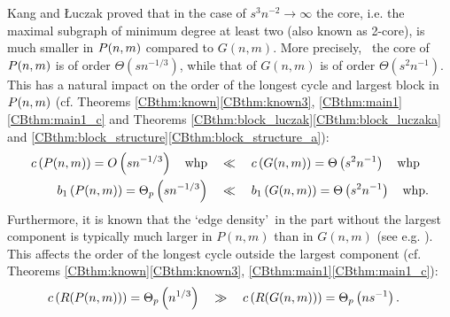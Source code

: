 Kang and {\L}uczak \cite{KangLuczak2012} proved that in the case of $s^3 n^{-2} \to \infty$ the core, i.e. the maximal subgraph of minimum degree at least two (also known as 2-core), is much smaller in $P(n,m)$ compared to $G(n,m)$. More precisely, \whp\ the core of $P(n,m)$ is of order $\Theta\left(sn^{-1/3}\right)$, while that of $G(n,m)$ is of order $\Theta\left(s^2n^{-1}\right)$. This has a natural impact on the order of the longest cycle and largest block in $P(n,m)$ (cf. Theorems \ref{CBthm:known}\ref{CBthm:known3}, \ref{CBthm:main1}\ref{CBthm:main1_c} and Theorems \ref{CBthm:block_luczak}\ref{CBthm:block_luczaka} and \ref{CBthm:block_structure}\ref{CBthm:block_structure_a}):
\begin{align*}
c\left({P(n,m)}\right)=O\left(sn^{-1/3}\right)\quad \text{whp} \quad &\ll \quad c\left({G(n,m)}\right)=\Theta\left(s^2 n^{-1}\right) \quad \text{whp}
\\
b_{1}\left(P(n,m)\right)=\Theta_p\left(sn^{-1/3}\right) \quad &\ll \quad b_{1}\left(G(n,m)\right)=\Theta\left(s^2 n^{-1}\right) \quad \text{whp}.
\end{align*}	
Furthermore, it is known that the \lq edge density\rq\ in the part without the largest component is typically much larger in $P(n,m)$ than in $G(n,m)$ (see e.g. \cite[Theorem 1.7]{KangMosshammerSpruessel2020}). This affects the order of the longest cycle outside the largest component (cf. Theorems \ref{CBthm:known}\ref{CBthm:known3}, \ref{CBthm:main1}\ref{CBthm:main1_c}):
\begin{align*}
c\left({R (P(n,m))}\right)=\Theta_p\left(n^{1/3}\right)\quad &\gg \quad c\left({R (G(n,m))}\right)=\Theta_p\left(n s^{-1}\right).
\end{align*}

